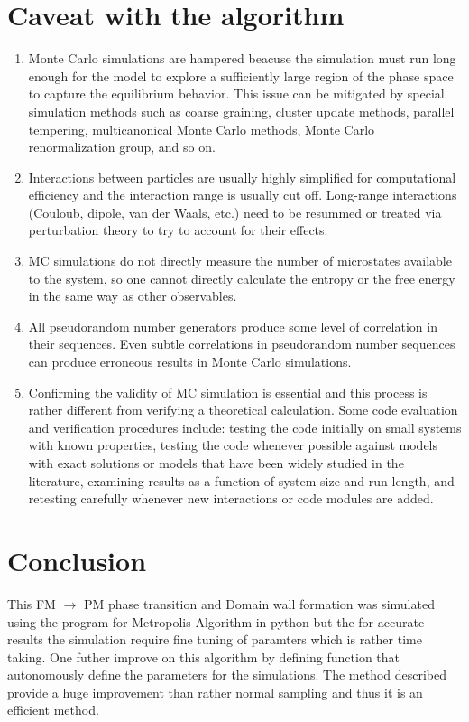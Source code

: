 \documentclass[5p,authoryear]{elsarticle}
\begin{document}
\section{Caveat with the algorithm}
\begin{enumerate}
  \item Monte Carlo simulations are hampered beacuse the simulation must run long enough for the model to explore a sufficiently large region of the phase space to capture the equilibrium behavior. This issue can be mitigated by special simulation methods such as coarse graining, cluster update methods, parallel tempering, multicanonical Monte Carlo methods, Monte Carlo renormalization group, and so on.
  \item Interactions between particles are usually highly simplified for computational efficiency and the interaction range is usually cut off. Long-range interactions (Couloub, dipole, van der Waals, etc.) need to be resummed or treated via perturbation theory to try to account for their effects.
  \item MC simulations do not directly measure the number of microstates available to the system, so one cannot directly calculate the entropy or the free energy in the same way as other observables.
  \item All pseudorandom number generators produce some level of correlation in their sequences. Even subtle correlations in pseudorandom number sequences can produce erroneous results in Monte Carlo simulations.
  \item Confirming the validity of MC simulation is essential and this process is rather different from verifying a theoretical calculation. Some code
evaluation and verification procedures include: testing the code initially on small systems with known properties, testing the code whenever possible against models with exact solutions or models that have been widely studied in the literature, examining results as a function of system size and run length, and retesting carefully whenever new interactions or code modules are added.
\end{enumerate}

\section{Conclusion}
This FM $\rightarrow$ PM phase transition and Domain wall formation was simulated using the program for Metropolis Algorithm in python but the for accurate results the simulation require fine tuning of paramters which is rather time taking. One futher improve on this algorithm by defining function that autonomously define the parameters for the simulations. The method described provide a huge improvement than rather normal sampling and thus it is an efficient method.
\end{document}
